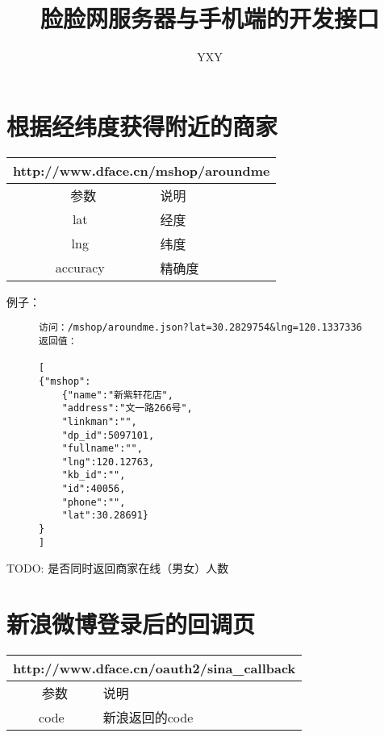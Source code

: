 \documentclass[cs4size]{ctexartutf8}
\author{YXY}
\title{脸脸网服务器与手机端的开发接口}
\begin{document}
 

\maketitle
\tableofcontents


\section{根据经纬度获得附近的商家}

\begin{table}[H]
   \begin{center}
\begin{tabular}{|c|p{12cm}|}
\hline
\multicolumn{2}{|c|}{http://www.dface.cn/mshop/aroundme} \\
\hline\hline
 \  参数  &  说明  \\
\hline
 lat  &  经度\\
\hline
 lng  &  纬度\\ 
\hline
 accuracy  &  精确度\\ 
\hline
\end{tabular}
   \end{center}
\end{table}


例子：

\begin{figure}[H]
\begin{verbatim}
访问：/mshop/aroundme.json?lat=30.2829754&lng=120.1337336
返回值：

[
{"mshop":
	{"name":"新紫轩花店",
	"address":"文一路266号",
	"linkman":"",
	"dp_id":5097101,
	"fullname":"",
	"lng":120.12763,
	"kb_id":"",
	"id":40056,
	"phone":"",
	"lat":30.28691}
}
]

\end{verbatim}
\end{figure}
     

TODO: 是否同时返回商家在线（男女）人数


\section{新浪微博登录后的回调页}

\begin{table}[H]
   \begin{center}
\begin{tabular}{|c|p{12cm}|}
\hline
\multicolumn{2}{|c|}{http://www.dface.cn/oauth2/sina\_callback} \\
\hline\hline
 \  参数  &  说明  \\
\hline
 code  &  新浪返回的code\\
\hline
\end{tabular}
   \end{center}
\end{table}
\end{document}
